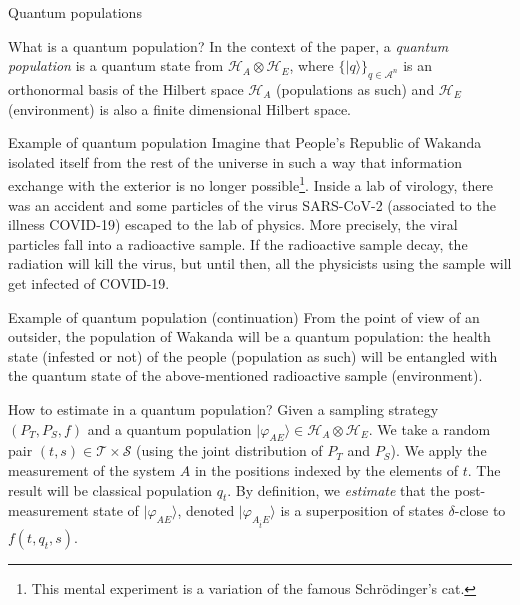 \documentclass{beamer}
\begin{document}
\begin{frame}
\begin{center}
\Large{Quantum populations}
\end{center}
\end{frame}

\begin{frame}{What is a quantum population?} 
In the context of the paper, a \emph{quantum population} is a quantum state from $\mathcal{H}_A \otimes \mathcal{H}_E$, where $\{|q\rangle\}_{q\in\mathcal{A}^n}$ is an orthonormal basis of the Hilbert space $\mathcal{H}_A$ (populations as such) and $\mathcal{H}_E$ (environment) is also a finite dimensional Hilbert space.
\end{frame}

\begin{frame}{Example of quantum population} 
Imagine that People's Republic of Wakanda isolated itself from the rest of the universe in such a way that information exchange with the exterior is no longer possible\footnote{This mental experiment is a variation of the famous Schr\"odinger's cat.}. Inside a lab of virology, there was an accident and some particles of the virus SARS-CoV-2 (associated to the illness COVID-19) escaped to the lab of physics. More precisely, the viral particles fall into a radioactive sample. If the radioactive sample decay, the radiation will kill the virus, but until then, all the physicists using the sample will get infected of COVID-19.
\end{frame}

\begin{frame}{Example of quantum population (continuation)} 
From the point of view of an outsider, the population of Wakanda will be a quantum population: the health state (infested or not) of the people (population as such) will be entangled with the quantum state of the above-mentioned radioactive sample (environment).
\end{frame}

\begin{frame}{How to estimate in a quantum population?} 
Given a sampling strategy $\left(P_T, P_S, f \right)$ and a quantum population $|\varphi_{AE}\rangle \in \mathcal{H}_A \otimes \mathcal{H}_E$. We take a random pair $(t, s) \in \mathcal{T} \times \mathcal{S}$ (using the joint distribution of $P_T$ and $P_S$). We apply the measurement of the system $A$ in the positions indexed by the elements of $t$. The result will be classical population $q_t$. By definition, we \emph{estimate} that  the post-measurement state of  $|\varphi_{AE}\rangle$, denoted $|\varphi_{A_{\overline{t}}E}\rangle$ is a superposition of states $\delta$-close to $f(t, q_t, s)$.
\end{frame}
\end{document}
